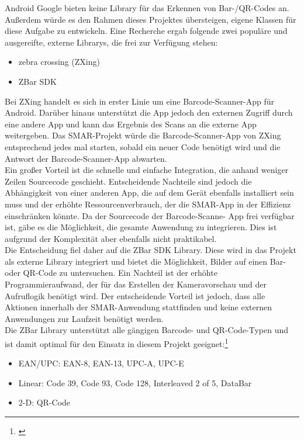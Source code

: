 Android \bzw Google bieten keine Library für das Erkennen von Bar-/QR-Codes an. Außerdem würde es den Rahmen dieses Projektes übersteigen, eigene Klassen für diese Aufgabe zu entwickeln. Eine Recherche ergab folgende zwei populäre und ausgereifte, externe Librarys, die frei zur Verfügung stehen:
\begin{itemize}
	\item zebra crossing (ZXing)
	\item ZBar SDK
\end{itemize}
Bei ZXing handelt es sich in erster Linie um eine Barcode-Scanner-App für Android. Darüber hinaus unterstützt die App jedoch den externen Zugriff durch eine andere App und kann das Ergebnis des Scans an die externe App weitergeben. Das \ac{SMAR}-Projekt würde die Barcode-Scanner-App von ZXing entsprechend jedes mal starten, sobald ein neuer Code benötigt wird und die Antwort der Barcode-Scanner-App abwarten.\\
Ein großer Vorteil ist die schnelle und einfache Integration, die anhand weniger Zeilen Sourcecode geschieht. Entscheidende Nachteile sind jedoch die Abhängigkeit von einer anderen App, die auf dem Gerät ebenfalls installiert sein muss und der erhöhte Ressourcenverbrauch, der die \ac{SMAR}-App in der Effizienz einschränken könnte. Da der Sourcecode der Barcode-Scanne- App frei verfügbar ist, gäbe es die Möglichkeit, die gesamte Anwendung zu integrieren. Dies ist aufgrund der Komplexität aber ebenfalls nicht praktikabel.\\

Die Entscheidung fiel daher auf die ZBar SDK Library. Diese wird in das Projekt als externe Library integriert und bietet die Möglichkeit, Bilder auf einen Bar- oder QR-Code zu untersuchen. Ein Nachteil ist der erhöhte Programmieraufwand, der für das Erstellen der Kameravorschau und der Aufruflogik benötigt wird. Der entscheidende Vorteil ist jedoch, dass alle Aktionen innerhalb der \ac{SMAR}-Anwendung stattfinden und keine externen Anwendungen zur Laufzeit benötigt werden.\\

Die ZBar Library unterstützt alle gängigen Barcode- und QR-Code-Typen und ist damit optimal für den Einsatz in diesem Projekt geeignet:\footnote{\citep{zbar}}
\begin{itemize}
	\item EAN/UPC: EAN-8, EAN-13, UPC-A, UPC-E
	\item Linear: Code 39, Code 93, Code 128, Interleaved 2 of 5, DataBar
	\item 2-D: QR-Code
\end{itemize}

